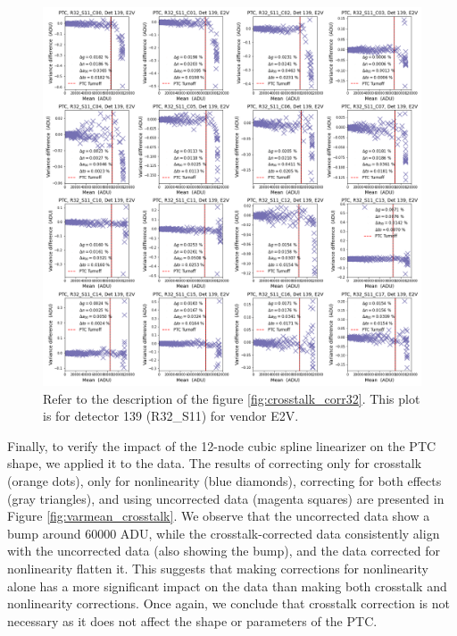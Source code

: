 \begin{figure}[!htb]
    \centering
    \includegraphics[width=\textwidth]{Figures/ptc_crosstalk139.png}
    \caption{Refer to the description of the figure \ref{fig:crosstalk_corr32}. This plot is for detector 139 (R32\_S11) for vendor E2V.}
    \label{fig:crosstalk_corr139}
\end{figure}

Finally, to verify the impact of the 12-node cubic spline linearizer on the PTC shape, we applied it to the data. The results of correcting only for crosstalk (orange dots), only for nonlinearity (blue diamonds), correcting for both effects (gray triangles), and using uncorrected data (magenta squares) are presented in Figure \ref{fig:varmean_crosstalk}. We observe that the uncorrected data show a bump around 60000 ADU, while the crosstalk-corrected data consistently align with the uncorrected data (also showing the bump), and the data corrected for nonlinearity flatten it. This suggests that making corrections for nonlinearity alone has a more significant impact on the data than making both crosstalk and nonlinearity corrections. Once again, we conclude that crosstalk correction is not necessary as it does not affect the shape or parameters of the PTC.


